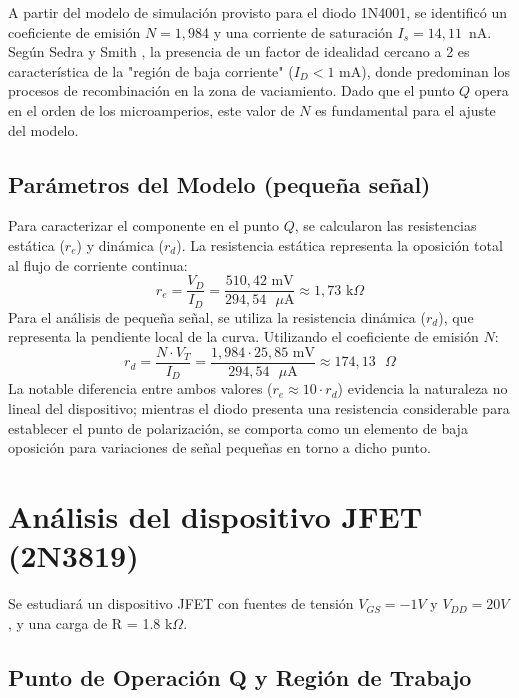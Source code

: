 \documentclass[conference]{IEEEtran} \IEEEoverridecommandlockouts
\begin{document}
   A partir del modelo de simulación provisto para el diodo 1N4001, se identificó un coeficiente de emisión $N = 1,984$ y una corriente de saturación $I_s = 14,11$~nA. Según Sedra y Smith \cite{b2}, la presencia de 
   un factor de idealidad cercano a 2 es característica de la "región de baja corriente" ($I_D < 1$ mA), donde predominan los procesos de recombinación
    en la zona de vaciamiento. Dado que el punto $Q$ opera en el orden de los microamperios, este valor de $N$ es fundamental para el ajuste del 
    modelo. \subsection{Parámetros del Modelo (pequeña señal)} Para caracterizar el componente en el punto $Q$, se calcularon las resistencias estática
     ($r_e$) y dinámica ($r_d$). La resistencia estática representa la oposición total al flujo de corriente continua:
      \begin{equation} r_e = \frac{V_D}{I_D} = \frac{510,42 \text{ mV}}{294,54 \text{ }\mu\text{A}} \approx 1,73 \text{ k}\Omega \end{equation} 
      Para el análisis de pequeña señal, se utiliza la resistencia dinámica ($r_d$), que representa la pendiente local de la curva. Utilizando 
      el coeficiente de emisión $N$: \begin{equation} r_d = \frac{N \cdot V_T}{I_D} = \frac{1,984 \cdot 25,85 \text{ mV}}{294,54 \text{ }\mu\text{A}} 
        \approx 174,13 \text{ }\Omega \end{equation} La notable diferencia entre ambos valores ($r_e \approx 10 \cdot r_d$) evidencia la naturaleza 
        no lineal del dispositivo; mientras el diodo presenta una resistencia considerable para establecer el punto de polarización, se comporta 
        como un elemento de baja oposición para variaciones de señal pequeñas en torno a dicho punto. 
    
\section{Análisis del dispositivo JFET (2N3819)}
Se estudiará un dispositivo JFET con fuentes de tensión $V_{GS} = -1 V$ y $V_{DD}= 20 V$, y una carga de R = 1.8 k$ \Omega$.
    
    \subsection{Punto de Operación Q y Región de Trabajo}
    
\end{document}
